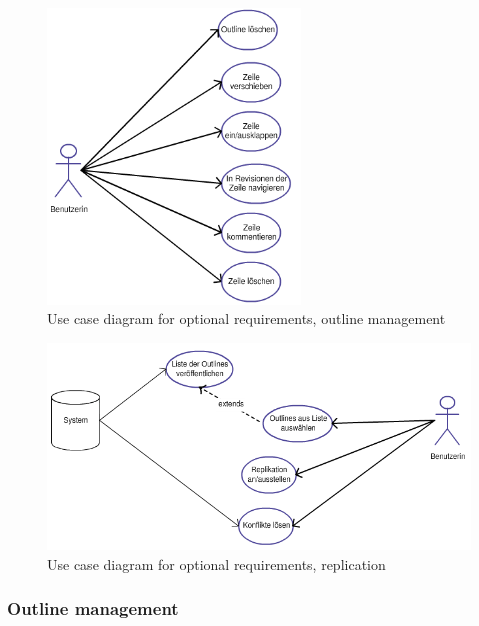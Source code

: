\medskip
\begin{figure}[ht] 
  \begin{center}
  \includegraphics[width=0.6\textwidth]{grafik/usecasediagramm-kann-editor} 
  \end{center}
  \caption{Use case diagram for optional requirements, outline management}
  \label{fig:usecasediagramm-kann-editor}
\end{figure}

\medskip
\begin{figure}[ht] 
  \begin{center}
  \includegraphics[width=\textwidth]{grafik/usecasediagramm-kann-repl} 
  \end{center}
  \caption{Use case diagram for optional requirements, replication}
  \label{fig:usecasediagramm-kann-repl} 
\end{figure}


\subsubsection{Outline management}

